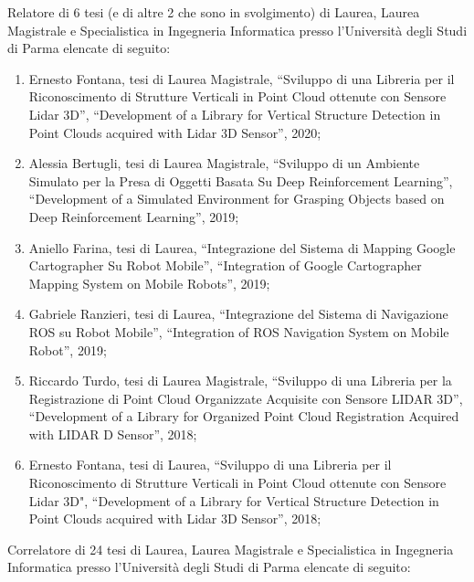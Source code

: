 \documentclass[11pt]{article}
\begin{document}
Relatore di 6 tesi (e di altre 2 che sono in svolgimento) di Laurea, Laurea Magistrale e Specialistica in Ingegneria Informatica presso l'Universit\`a degli Studi di Parma elencate di seguito: 
\begin{enumerate}
\item Ernesto Fontana, tesi di Laurea Magistrale, ``Sviluppo di una Libreria per il Riconoscimento di Strutture Verticali in Point Cloud ottenute con Sensore Lidar 3D'', 
   ``Development of a Library for Vertical Structure Detection in Point Clouds acquired with Lidar 3D Sensor'', 2020;
\item Alessia Bertugli, tesi di Laurea Magistrale, ``Sviluppo di un Ambiente Simulato per la Presa di Oggetti Basata Su Deep Reinforcement Learning'', 
   ``Development of a Simulated Environment for Grasping Objects based on Deep Reinforcement Learning'', 2019;
\item Aniello Farina, tesi di Laurea, ``Integrazione del Sistema di Mapping Google Cartographer Su Robot Mobile'', 
  ``Integration of Google Cartographer Mapping System on Mobile Robots'', 2019;
\item Gabriele Ranzieri, tesi di Laurea, ``Integrazione del Sistema di Navigazione ROS su Robot Mobile'', ``Integration of ROS Navigation System on Mobile Robot'', 2019;
\item Riccardo Turdo, tesi di Laurea Magistrale, ``Sviluppo di una Libreria per la Registrazione di Point Cloud Organizzate Acquisite con Sensore LIDAR 3D'',
  ``Development of a Library for Organized Point Cloud Registration Acquired with LIDAR D Sensor'', 2018;
\item Ernesto Fontana, tesi di Laurea, ``Sviluppo di una Libreria per il Riconoscimento di Strutture Verticali in Point Cloud ottenute con Sensore Lidar 3D", 
   ``Development of a Library for Vertical Structure Detection in Point Clouds acquired with Lidar 3D Sensor'', 2018;
\end{enumerate}
%
\vspace{3mm}
%
Correlatore di 24 tesi di Laurea, Laurea Magistrale e Specialistica in Ingegneria Informatica presso l'Universit\`a degli Studi di Parma elencate di seguito: 
\end{document}
